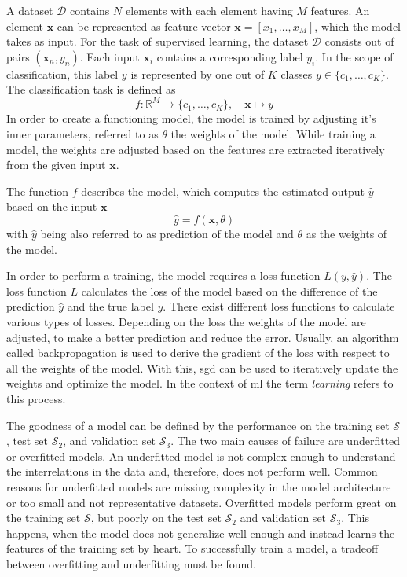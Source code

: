 A dataset $\mathcal{D}$ contains $N$ elements with each element having $M$ features.
An element $\textbf{x}$ can be represented as feature-vector $\textbf{x} = [x_1, \dots ,x_M]$, which the model takes as input.
For the task of supervised learning, the dataset $\mathcal{D}$ consists out of pairs $(\textbf{x}_n, y_n)$. Each input $\textbf{x}_i$ contains a corresponding label $y_i$.
In the scope of classification, this label $y$ is represented by one out of $K$ classes $y \in \lbrace c_1, \dots, c_K \rbrace$.
The classification task is defined as  
\begin{equation}
	f: \mathbb{R}^M \rightarrow \lbrace c_1,\ldots,c_K \rbrace, \quad \textbf{x} \mapsto y
\end{equation}
In order to create a functioning model, the model is trained by adjusting it's inner parameters, referred to as $ \theta $ the weights of the model.
While training a model, the weights are adjusted based on the features are extracted iteratively from the given input $\textbf{x}$.

The function $f$ describes the model, which computes the estimated output $\hat{y}$ based on the input $\textbf{x}$
\begin{equation}
	\hat y = f(\textbf{x}, \theta)
\end{equation}
with $\hat{y}$ being also referred to as prediction of the model and $ \theta $ as the weights of the model.

In order to perform a training, the model requires a loss function $L(y,\hat{y})$.
The loss function $L$ calculates the loss of the model based on the difference of the prediction $\hat{y}$ and the true label $y$.
There exist different loss functions to calculate various types of losses.
Depending on the loss the weights of the model are adjusted, to make a better prediction and reduce the error.
Usually, an algorithm called backpropagation \cite{Lin76-Backprob} is used to derive the gradient of the loss with respect to all the weights of the model.
With this, \gls{sgd} can be used to iteratively update the weights and optimize the model.
In the context of \gls{ml} the term \textit{learning} refers to this process.

The goodness of a model can be defined by the performance on the training set $\mathcal{S}$, test set $\mathcal{S}_2$, and validation set $\mathcal{S}_3$.
The two main causes of failure are underfitted or overfitted models.
An underfitted model is not complex enough to understand the interrelations in the data and, therefore, does not perform well.
Common reasons for underfitted models are missing complexity in the model architecture or too small and not representative datasets.
Overfitted models perform great on the training set $\mathcal{S}$, but poorly on the test set $\mathcal{S}_2$ and validation set $\mathcal{S}_3$.
This happens, when the model does not generalize well enough and instead learns the features of the training set by heart.
To successfully train a model, a tradeoff between overfitting and underfitting must be found.

